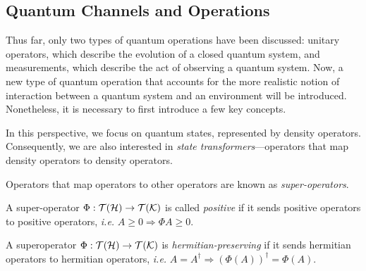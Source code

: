 


\subsection{Quantum Channels and Operations} \label{subsec:quantum_channels}


Thus far, only two types of quantum operations have been discussed: unitary operators, which describe the evolution of a closed quantum system, and measurements, which describe the act of observing a quantum system. Now, a new type of quantum operation that accounts for the more realistic notion of interaction between a quantum system and an environment will be introduced. Nonetheless, it is necessary to first introduce a few key concepts. 


\vspace{5pt}

In this perspective, we focus on quantum states, represented by density operators. Consequently, we are also interested in \emph{state transformers}---operators that map density operators to density operators.

\begin{definition}
 Operators that map operators to other operators are known as \emph{super-operators}. 
\end{definition}


\begin{definition} \label{def:positive_superoperator}
  A super-operator $\Phi: \mathcal{T}(\mathcal{H}) \to \mathcal{T}(\mathcal{K}) $ is called \emph{positive} if it sends positive operators to positive operators, \textit{i.e.} $A \geq 0 \Rightarrow{} \Phi A \geq 0$.
\end{definition}


\begin{definition}
  A superoperator $ \Phi : \mathcal{T}(\mathcal{H}) \to \mathcal{T}(\mathcal{K})$ is \emph{hermitian-preserving} if it sends hermitian operators to hermitian operators, \textit{i.e.} $A = A^\dag \Rightarrow{} (\Phi(A))^\dag = \Phi(A)$.
\end{definition}

